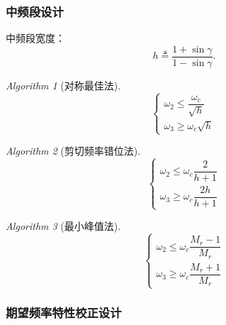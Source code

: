 \documentclass[14pt,a4paper]{article}
\theoremstyle{plain}
\theoremstyle{definition}
\theoremstyle{remark}
\theoremstyle{plain}
\theoremstyle{plain}
\theoremstyle{plain}
\theoremstyle{definition}
\theoremstyle{remark}
\newtheorem{alg}{Algorithm}[section]
\numberwithin{equation}{section}
\begin{document}
			\subsubsection{中频段设计}%
			\label{ssub:中频段设计}
	
				中频段宽度：
				\begin{equation}
				\label{eq:midFreqWidth}
				h \triangleq \dfrac{1+\sin \gamma }{1-\sin \gamma} 
				.\end{equation}

				\begin{alg}[对称最佳法]  
				\label{alg:对称最佳法}
					\begin{equation}
					\label{eq:对称最佳}
					\begin{cases}
						\omega_2 \le  \dfrac{\omega_c }{\sqrt{h}}\\ 
						\omega_3 \ge \omega_c \sqrt{h} 
					\end{cases} 
					\end{equation} 
				\end{alg} 

				\begin{alg}[剪切频率错位法]  
				\label{alg:剪切频率错位法}
					\begin{equation}
					\label{eq:剪切频率错位}
						\begin{cases}
							\omega_2 \le \omega_c \dfrac{2}{h+1} \\ 
							\omega_3 \ge  \omega_c \dfrac{2h}{h+1} 
						\end{cases} 
					\end{equation} 	
				\end{alg} 

				\begin{alg}[最小峰值法]  
				\label{alg:最小峰值法}
					\begin{equation}
					\label{eq:最小峰值}
						\begin{cases}
							\omega_2 \le  \omega_c \dfrac{M_r -1}{M_r} \\ 
							\omega_3 \ge  \omega_c \dfrac{M_r+1}{M_r} 
						\end{cases} 
					\end{equation} 
				\end{alg} 

			\subsubsection{期望频率特性校正设计}%
			\label{ssub:期望频率特性校正设计}
	
\end{document}
